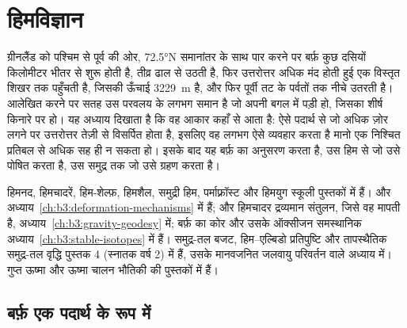 \chapter{हिमविज्ञान}\label{ch:b3:glaciology}

ग्रीनलैंड को पश्चिम से पूर्व की ओर, \ang{72.5}N समानांतर के साथ पार करने पर बर्फ़
कुछ दसियों किलोमीटर भीतर से शुरू होती है, तीव्र ढाल से उठती है, फिर उत्तरोत्तर अधिक मंद होती
हुई एक विस्तृत शिखर तक पहुँचती है, जिसकी ऊँचाई \qty{3229}{m} है, और फिर
पूर्वी तट के पर्वतों तक नीचे उतरती है। आलेखित करने पर सतह उस परवलय के लगभग समान है जो
अपनी बगल में पड़ी हो, जिसका शीर्ष किनारे पर हो। यह अध्याय दिखाता है कि वह आकार कहाँ से
आता है: ऐसे पदार्थ से जो अधिक ज़ोर लगने पर उत्तरोत्तर तेज़ी से विसर्पित होता है,
इसलिए वह लगभग ऐसे व्यवहार करता है मानो एक निश्चित प्रतिबल से अधिक सह ही न सकता हो।
इसके बाद यह बर्फ़ का अनुसरण करता है, उस हिम से जो उसे पोषित करता है, उस
समुद्र तक जो उसे ग्रहण करता है।

\begin{recall}
हिमनद, हिमचादरें, हिम-शेल्फ़, हिमशैल, समुद्री हिम, पर्माफ़्रॉस्ट और
हिमयुग स्कूली पुस्तकों में हैं।  और 
अध्याय~\ref{ch:b3:deformation-mechanisms} में हैं;  और
हिमचादर द्रव्यमान संतुलन, जिसे वह मापती है, अध्याय~\ref{ch:b3:gravity-geodesy} में;
बर्फ़ का कोर और उसके ऑक्सीजन समस्थानिक अध्याय~\ref{ch:b3:stable-isotopes} में हैं।
समुद्र-तल बजट, हिम--एल्बिडो प्रतिपुष्टि और तापस्थैतिक समुद्र-तल
वृद्धि पुस्तक 4 (स्नातक वर्ष 2) में हैं, उसके मानवजनित
जलवायु परिवर्तन वाले अध्याय में। गुप्त ऊष्मा और ऊष्मा चालन भौतिकी की पुस्तकों में हैं।
\end{recall}

\section{बर्फ़ एक पदार्थ के रूप में}\label{sec:b3:glaciology:material}

